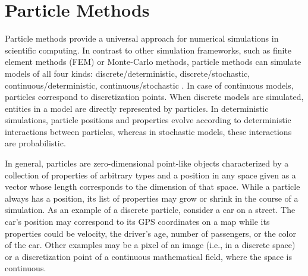 \section{Particle Methods}
\label{sec:particle_methods}
Particle methods provide a universal approach for numerical simulations in scientific computing. 
In contrast to other simulation frameworks, such as finite element methods (FEM) or Monte-Carlo methods,
particle methods can simulate models of all four kinds: discrete/deterministic, discrete/stochastic, 
continuous/deterministic, continuous/stochastic \cite{Sbalzarini:2013}. In case of continuous models, particles correspond to 
discretization points. When discrete models are simulated, entities in a model are directly represented
by particles. In deterministic simulations, particle positions and properties evolve according to deterministic
interactions between particles, whereas in stochastic models, these interactions are probabilistic.

In general, particles are zero-dimensional point-like objects characterized by a collection of properties 
of arbitrary types and a position in any space given as a vector whose length corresponds to the dimension
of that space. While a particle always has a position, its list of properties may grow or shrink in the course of 
a simulation. 
%
As an example of a discrete particle, consider a car on a street. The car's position may correspond to its 
GPS coordinates on a map while its properties could be velocity, the driver's age, number of passengers,  
or the color of the car. Other examples may be a pixel of an image (i.e., in a discrete space) or a discretization point of a continuous mathematical field, 
where the space is continuous.

